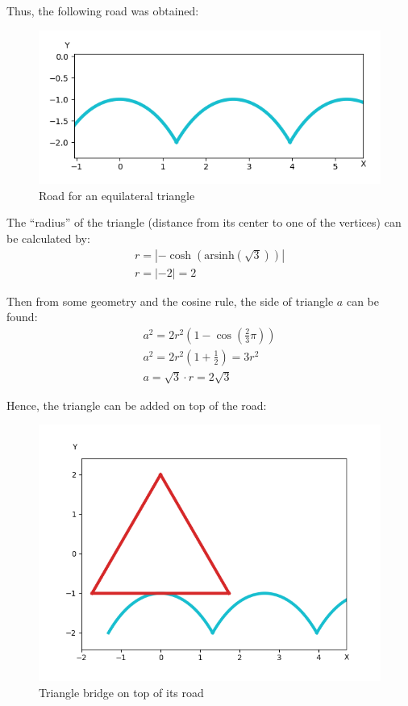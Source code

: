 \documentclass[12pt]{article}
\begin{document}
        Thus, the following road was obtained:
        \begin{figure}[H]
            \centering
            \includegraphics[width=\linewidth]{images/triangle_road.png}
            \caption{Road for an equilateral triangle}
        \end{figure}

        The ``radius'' of the triangle (distance from its center to one of the vertices) can be calculated by:
        \begin{align}
            r = | -\cosh( \text{arsinh}(\sqrt{3}) ) | \\
            r = | -2 | = 2
        \end{align}

        Then from some geometry and the cosine rule, the side of triangle $a$ can be found:
        \begin{align}
            a^2 = 2r^2 (1 - \cos(\frac{2}{3}\pi)) \\
            a^2 = 2r^2 (1 + \frac{1}{2}) = 3r^2 \\
            a = \sqrt{3} \cdot r = 2\sqrt{3}
        \end{align}

        Hence, the triangle can be added on top of the road:
        \begin{figure}[H]
            \centering
            \includegraphics[width=0.8\linewidth]{images/tirangle_road_with.png}
            \caption{Triangle bridge on top of its road}
        \end{figure}
\end{document}
